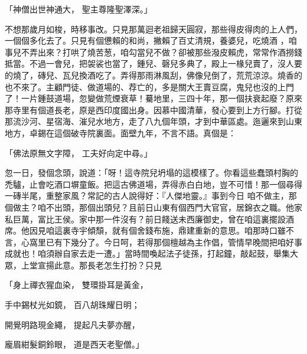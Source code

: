 「神僧出世神通大，  聖主尊隆聖澤深。」

不想那歲月如梭，時移事改。只見那萬迴老祖歸天圓寂，那些得皮得肉的上人們，一個個多化去了。只見有個憊賴的和尚，撇賴了百丈清規，養婆兒，吃燒酒 ，咱事兒不弄出來？打哄了燒苦葱，咱勾當兒不做？卻被那些潑皮賴虎，常常作酒撈錢抵當。不過一會兒，把袈裟也當了，鍾兒、磬兒多典了，殿上一椽兒賣了，沒人要的燒了，磚兒、瓦兒換酒吃了。弄得那雨淋風刮，佛像兒倒了，荒荒涼涼。燒香的也不來了。主顧門徒、做道場的、荐亡的，多是關大王賣豆腐，鬼兒也沒的上門了！一片鍾鼓道場，忽變做荒煙衰草！驀地里，三四十年，那一個扶衰起廢？原來那寺里有個道長老，原是西印度國出身。因慕中國清華，發心要到上方行腳。打從那流沙河、星宿海、漼兒水地方，走了八九個年頭，才到中華區處。迤邐來到山東地方，卓錫在這個破寺院裏面。面壁九年，不言不語。真個是：

「佛法原無文字障，  工夫好向定中尋。」

忽一日，發個念頭，說道：「呀！這寺院兒坍塌的這模樣了。你看這些蠢頭村胸的禿驢，止會吃酒口塀童飯。把這古佛道場，弄得赤白白地，豈不可惜！那一個尋得一磚半尾，重整家風？常記的古人說得好：『人傑地靈。』事到今日 咱不做主，那個做主？咱不出頭，那個出頭兒？且前日山東有個西門大官官，居錦衣之職。他家私巨萬，富比王侯。家中那一件沒有？前日餞送未西廉御史，曾在咱這裏擺設酒席。他因見咱這裏寺宇傾頹，就有個舍錢布施，鼎建重新的意思。咱那時口雖不言，心窩里已有下幾分了。今日呵，若得那個檀越為主作倡，管情早晚間把咱好事成就也！咱須辦自家去走一遭。」當時間喚起法子徒孫，打起鐘，敲起鼓，舉集大眾，上堂宣揚此意。那長老怎生打扮？只見

「身上禪衣猩血染，  雙環掛耳是黃金，

手中錫杖光如鏡，  百八胡珠耀日明；

開覺明路現金繩，  提起凡夫夢亦醒，

龐眉紺髮銅鈴眼，  道是西天老聖僧。」

